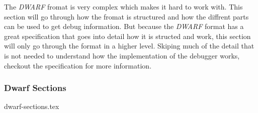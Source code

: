  

The \emph{DWARF} fromat is very complex which makes it hard to work with.
This section will go through how the fromat is structured and how the diffrent parts can be used to get debug information.
But because the \emph{DWARF} format has a great specification that goes into detail how it is structed and work, this section will only go through the format in a higher level.
Skiping much of the detail that is not needed to understand how the implementation of the debugger works, checkout the specification \cite{dwarf} for more information.

\subsubsection{Dwarf Sections}
{dwarf-sections.tex}


